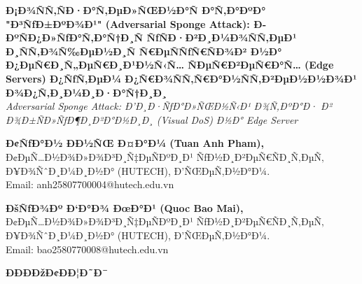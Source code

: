 \documentclass[]{article}
\author{}
\date{}
\begin{document}
\textbf{Ð¡Ð¾ÑÑ‚ÑÐ·Ð°Ñ‚ÐµÐ»ÑŒÐ½Ð°Ñ Ð°Ñ‚Ð°ÐºÐ° "Ð³ÑƒÐ±ÐºÐ¾Ð¹" (Adversarial Sponge Attack): Ð­ÐºÑÐ¿Ð»ÑƒÐ°Ñ‚Ð°Ñ†Ð¸Ñ ÑƒÑÐ·Ð²Ð¸Ð¼Ð¾ÑÑ‚ÐµÐ¹ Ð¸ÑÑ‚Ð¾Ñ‰ÐµÐ½Ð¸Ñ Ñ€ÐµÑÑƒÑ€ÑÐ¾Ð² Ð½Ð° Ð¿ÐµÑ€Ð¸Ñ„ÐµÑ€Ð¸Ð¹Ð½Ñ‹Ñ… ÑÐµÑ€Ð²ÐµÑ€Ð°Ñ… (Edge Servers) Ð¿ÑƒÑ‚ÐµÐ¼ Ð¿Ñ€Ð¾ÑÑ‚Ñ€Ð°Ð½ÑÑ‚Ð²ÐµÐ½Ð½Ð¾Ð¹ Ð¾Ð¿Ñ‚Ð¸Ð¼Ð¸Ð·Ð°Ñ†Ð¸Ð¸}\\
\emph{Adversarial Sponge Attack: Ð’Ð¸Ð·ÑƒÐ°Ð»ÑŒÐ½Ñ‹Ð¹ Ð¾Ñ‚ÐºÐ°Ð· Ð² Ð¾Ð±ÑÐ»ÑƒÐ¶Ð¸Ð²Ð°Ð½Ð¸Ð¸ (Visual DoS) Ð½Ð° Edge Server}

\textbf{Ð¢ÑƒÐ°Ð½ ÐÐ½ÑŒ Ð¤Ð°Ð¼ (Tuan Anh Pham),}\\
Ð¢ÐµÑ…Ð½Ð¾Ð»Ð¾Ð³Ð¸Ñ‡ÐµÑÐºÐ¸Ð¹ ÑƒÐ½Ð¸Ð²ÐµÑ€ÑÐ¸Ñ‚ÐµÑ‚ Ð¥Ð¾ÑˆÐ¸Ð¼Ð¸Ð½Ð° (HUTECH), Ð’ÑŒÐµÑ‚Ð½Ð°Ð¼.\\
Email: anh25807700004@hutech.edu.vn

\textbf{ÐšÑƒÐ¾Ðº Ð‘Ð°Ð¾ ÐœÐ°Ð¹ (Quoc Bao Mai),}\\
Ð¢ÐµÑ…Ð½Ð¾Ð»Ð¾Ð³Ð¸Ñ‡ÐµÑÐºÐ¸Ð¹ ÑƒÐ½Ð¸Ð²ÐµÑ€ÑÐ¸Ñ‚ÐµÑ‚ Ð¥Ð¾ÑˆÐ¸Ð¼Ð¸Ð½Ð° (HUTECH), Ð’ÑŒÐµÑ‚Ð½Ð°Ð¼.\\
Email: bao2580770008@hutech.edu.vn

\textbf{ÐÐÐÐžÐ¢ÐÐ¦Ð˜Ð¯}
\end{document}

